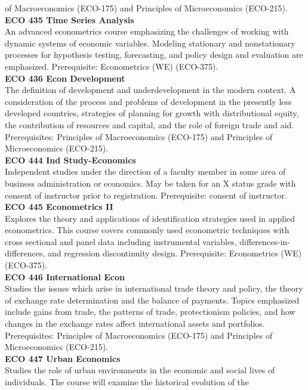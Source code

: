\documentclass[
  letterpaper,
]{scrbook}
\begin{document}
of Macroeconomics (ECO-175) and Principles of Microeconomics
(ECO-215).\\
\textbf{ECO 435 Time Series Analysis}\\
An advanced econometrics course emphasizing the challenges of working
with dynamic systems of economic variables. Modeling stationary and
nonstationary processes for hypothesis testing, forecasting, and policy
design and evaluation are emphasized. Prerequisite: Econometrics (WE)
(ECO-375).\\
\textbf{ECO 436 Econ Development}\\
The definition of development and underdevelopment in the modern
context. A consideration of the process and problems of development in
the presently less developed countries, strategies of planning for
growth with distributional equity, the contribution of resources and
capital, and the role of foreign trade and aid. Prerequisites:
Principles of Macroeconomics (ECO-175) and Principles of Microeconomics
(ECO-215).\\
\textbf{ECO 444 Ind Study-Economics}\\
Independent studies under the direction of a faculty member in some area
of business administration or economics. May be taken for an X status
grade with consent of instructor prior to registration. Prerequisite:
consent of instructor.\\
\textbf{ECO 445 Econometrics II}\\
Explores the theory and applications of identification strategies used
in applied econometrics. This course covers commonly used econometric
techniques with cross sectional and panel data including instrumental
variables, differences-in-differences, and regression discontinuity
design. Prerequisite: Econometrics (WE) (ECO-375).\\
\textbf{ECO 446 International Econ}\\
Studies the issues which arise in international trade theory and policy,
the theory of exchange rate determination and the balance of payments.
Topics emphasized include gains from trade, the patterns of trade,
protectionism policies, and how changes in the exchange rates affect
international assets and portfolios. Prerequisites: Principles of
Macroeconomics (ECO-175) and Principles of Microeconomics (ECO-215).\\
\textbf{ECO 447 Urban Economics}\\
Studies the role of urban environments in the economic and social lives
of individuals. The course will examine the historical evolution of the
\end{document}
